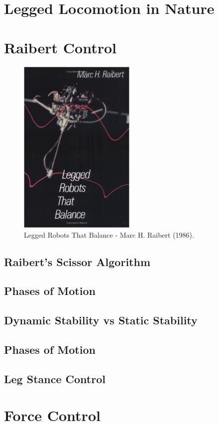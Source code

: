 \section{Legged Locomotion in Nature}

\section{Raibert Control}

\begin{figure}[H]
\centering
\includegraphics[width=0.5\textwidth]{images/literature/legged-robots-that-balance.jpg} 
\caption{Legged Robots That Balance - Marc H. Raibert (1986).}
\label{fig:legged-robots-that-balance}
\end{figure}

\subsection{Raibert's Scissor Algorithm}

\subsection{Phases of Motion}



\cite{Raibert1977}
\cite{Raibert1984}
\cite{Raibert1989}

\subsection{Dynamic Stability vs Static Stability}
\subsection{Phases of Motion}
\subsection{Leg Stance Control}
\section{Force Control}
